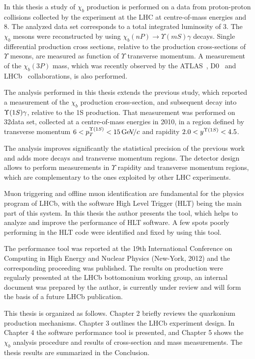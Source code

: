 In this thesis a study of $\chi_b$ production is performed on a data from proton-proton collisions 
collected by the \lhcb experiment at the LHC at centre-of-mass energies 
 and 8\tev. The analyzed data set corresponds to a total integrated luminosity
of 3\invfb. The $\chi_b$ mesons were reconstructed by using 
$\chi_b(nP)\rightarrow\Upsilon(mS)\gamma$ decays. Single differential
production cross sections, relative to the production cross-sections of
$\Upsilon$ mesons, are measured as function of $\Upsilon$ transverse momentum.
A measurement of the $\chi_b(3P)$ mass, which was recently observed by the 
ATLAS~\cite{Aad:2011ih}, D0~\cite{Abazov:2012gh} and
LHCb~\cite{LHCb-CONF-2012-020} collaborations, is also performed.

The analysis performed in this thesis extends the previous \lhcb
study\cite{LHCb-PAPER-2012-015}, which reported a measurement of the $\chi_b$
production cross-section, and subsequent decay into $\Y1S \gamma$, relative
to the \Y1S production. That measurement was performed on 32\invpb data set,
collected at a centre-of-mass energies \tev in 2010,  in a region defined by
transverse momentum $6  < p_{T}^{\Y1S} < 15 \gevc$ and rapidity  $2.0 <
y^{\Y1S} < 4.5$. 

The analysis improves significantly the statistical precision of the previous work and 
adds more decays and transverse momentum regions. The
\lhcb detector design allows to perform measurements in $\Upsilon$ rapidity and 
transverse momentum regions, which are complementary to the ones exploited 
by other LHC experiments. 

Muon triggering and offline muon identification are fundamental for 
the physics program of LHCb, with the software High Level Trigger (HLT) being 
the main part of this system. In this thesis the author presents the tool, which helps to
analyze and improve the performance of HLT software. A few spots poorly performing 
in the HLT code were identified and fixed by using this tool.

The performance tool was reported at the 19th International
Conference on Computing in High Energy and Nuclear Physics (New-York, 2012) and
the corresponding proceeding was published\cite{aprofiler}. The results on
\chib production were regularly presented at the LHCb bottomonium working group,
an internal document was prepared by the author, is currently under review and will form 
the basis of a future LHCb publication.

This thesis is organized as follows. 
Chapter 2 briefly reviews the quarkonium production mechanisms. Chapter 3
outlines the LHCb experiment design. In Chapter 4 the software performance tool 
is presented, and Chapter 5 shows the $\chi_b$ analysis procedure and
results of cross-section and \chibThreeP mass measurements. The thesis results are 
summarized in the Conclusion. 

